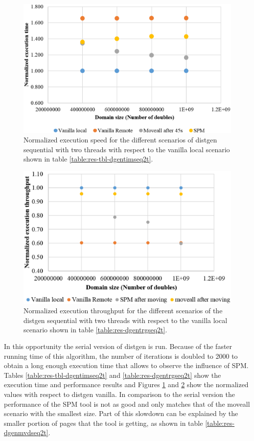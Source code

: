 \begin{figure}
	\centering
		\includegraphics[width=.7\textwidth]{figures/time-dgentt-ser.eps}
		\caption{Normalized execution speed for the different scenarios of  distgen sequential with two threads with respect to the vanilla local scenario shown in table \ref{table:res-tbl-dgentimseq2t}.}
		\label{fig:res-dgentimseq2t}
\end{figure}

\begin{figure}
	\centering
		\includegraphics[width=.7\textwidth]{figures/thrput-dgentt-ser.eps}
		\caption{Normalized execution throughput for the different scenarios of the distgen sequential with two threads with respect to the vanilla local scenario shown in table \ref{table:res-dgentrgseq2t}.}
		\label{fig:res-dgentrgseq2t}
\end{figure}


In this opportunity the serial version of distgen is run. Because of the faster running time of this algorithm, the number of iterations is doubled to 2000 to obtain a long enough execution time that allows to observe the influence of SPM. Tables \ref{table:res-tbl-dgentimseq2t} and \ref{table:res-dgentrgseq2t} show the execution time and performance results and Figures \ref{fig:res-dgentimseq2t} and \ref{fig:res-dgentrgseq2t} show the normalized values with respect to distgen vanilla. In comparison to the serial version the performance of the SPM tool is not as good and only matches that of the moveall scenario with the smallest size. Part of this slowdown can be explained by the smaller portion of pages that the tool is getting, as shown in table \ref{table:res-dgenmvdseq2t}.

